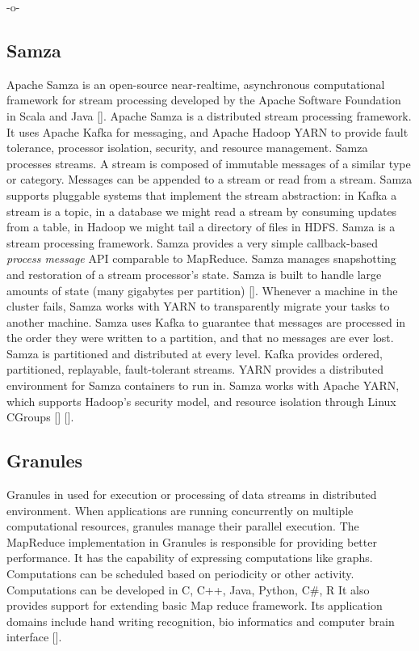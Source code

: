      -o-


     
\subsection{Samza}

Apache Samza is an open-source near-realtime, asynchronous
computational framework for stream processing developed by the Apache
Software Foundation in Scala and Java [\cite{www-samza-3}].  Apache
Samza is a distributed stream processing framework. It uses Apache
Kafka for messaging, and Apache Hadoop YARN to provide fault
tolerance, processor isolation, security, and resource
management. Samza processes streams. A stream is composed of immutable
messages of a similar type or category. Messages can be appended to a
stream or read from a stream.  Samza supports pluggable systems that
implement the stream abstraction: in Kafka a stream is a topic, in a
database we might read a stream by consuming updates from a table, in
Hadoop we might tail a directory of files in HDFS. Samza is a stream
processing framework. Samza provides a very simple callback-based
\textit{process message} API comparable to MapReduce.  Samza manages
snapshotting and restoration of a stream processor's state.  Samza is
built to handle large amounts of state (many gigabytes per
partition) [\cite{www-samza-1}].  Whenever a machine in the cluster
fails, Samza works with YARN to transparently migrate your tasks to
another machine. Samza uses Kafka to guarantee that messages are
processed in the order they were written to a partition, and that no
messages are ever lost.  Samza is partitioned and distributed at every
level. Kafka provides ordered, partitioned, replayable, fault-tolerant
streams. YARN provides a distributed environment for Samza containers
to run in. Samza works with Apache YARN, which supports Hadoop's
security model, and resource isolation through Linux
CGroups [\cite{www-samza-4}] [\cite{www-samza-3}].

\subsection{Granules}

Granules in used for execution or processing of data streams in
distributed environment.  When applications are running concurrently
on multiple computational resources, granules manage their parallel
execution.  The MapReduce implementation in Granules is responsible
for providing better performance. It has the capability of expressing
computations like graphs.  Computations can be scheduled based on
periodicity or other activity.  Computations can be developed in C,
C++, Java, Python, C\#, R It also provides support for extending basic
Map reduce framework.  Its application domains include hand writing
recognition, bio informatics and computer brain
interface [\cite{www-granules}].

